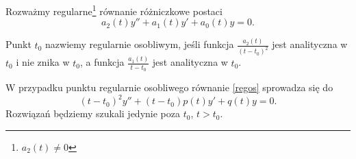%
Rozważmy regularne\footnote{$a_2(t) \not= 0$} równanie różniczkowe postaci
%
\begin{equation} \label{regos}
  a_2(t) y'' + a_1(t) y' + a_0(t) y = 0.
\end{equation}
%
\begin{definition}
  Punkt $t_0$ nazwiemy regularnie osobliwym, jeśli funkcja $\frac{a_2(t)}{(t-t_0)^2}$ jest analityczna w $t_0$ 
  i nie znika w $t_0$, a funkcja $\frac{a_1(t)}{t-t_0}$ jest analityczna w $t_0$.
\end{definition}
%
W przypadku punktu regularnie osobliwego równanie \eqref{regos} sprowadza się do
%
\begin{equation} \label{regos2}
  (t-t_0)^2 y'' + (t-t_0) p(t) y' + q(t) y = 0.
\end{equation}
%
Rozwiązań będziemy szukali jedynie poza $t_0$, $t > t_0$.
%
